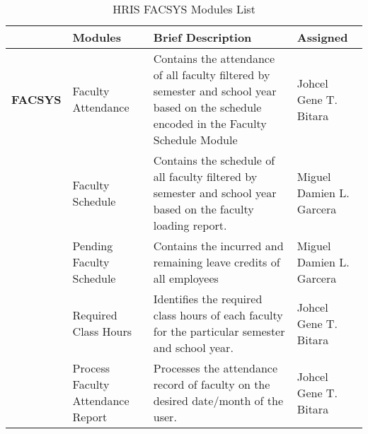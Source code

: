 \begin{table}[H]
    \begin{tabular}{@{}p{2cm}p{3.5cm}p{6cm}p{3.5cm}@{}}
    \toprule
    \multicolumn{1}{l}{} & \textbf{Modules}                  & \textbf{Brief Description}                                                                                                               & \textbf{Assigned}  \\ \midrule
    \textbf{FACSYS}      & Faculty Attendance                & Contains the attendance of all faculty filtered by semester and school year based on the schedule encoded in the Faculty Schedule Module & Johcel Gene T. Bitara               \\
                            & Faculty Schedule                  & Contains the schedule of all faculty filtered by semester and school year based on the faculty loading report.                           & Miguel Damien L. Garcera               \\
                            & Pending Faculty Schedule          & Contains the incurred and remaining leave credits of all employees                                                                       & Miguel Damien L. Garcera               \\
                            & Required Class Hours              & Identifies the required class hours of each faculty for the particular semester and school year.                                         & Johcel Gene T. Bitara               \\
                            & Process Faculty Attendance Report & Processes the attendance record of faculty on the desired date/month of the user.                                                        & Johcel Gene T. Bitara               \\ \bottomrule
    \end{tabular}
    \caption{HRIS FACSYS Modules List}
    \label{tab:hris-facsys-modules}
\end{table}

